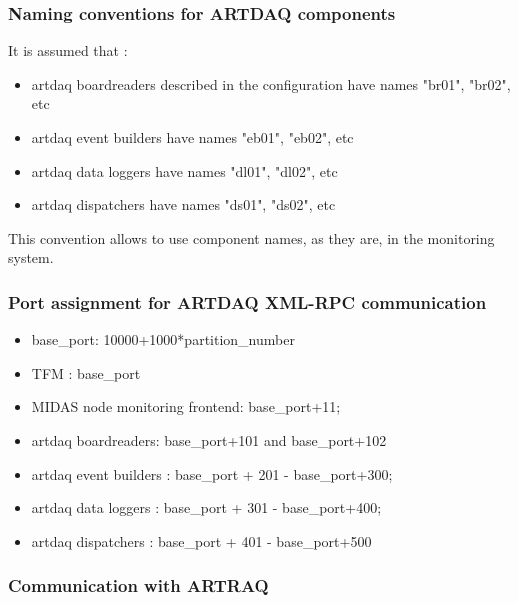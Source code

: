 \subsubsection{Naming conventions for ARTDAQ components}

It is assumed that :
\begin{itemize}
\item 
  artdaq boardreaders described in the configuration have names "br01", "br02", etc
\item 
  artdaq event builders have names "eb01", "eb02", etc
\item 
  artdaq data loggers have names "dl01", "dl02", etc
\item 
  artdaq dispatchers have names "ds01", "ds02", etc
\end{itemize}

This convention allows to use component names, as they are, in the monitoring system.

\subsubsection{Port assignment for ARTDAQ XML-RPC communication}
\begin{itemize}
\item
  base\_port: 10000+1000*partition\_number
\item 
  TFM : base\_port
\item 
  MIDAS node monitoring frontend: base\_port+11;
\item 
  artdaq boardreaders: base\_port+101 and base\_port+102
\item 
  artdaq event builders : base\_port + 201 - base\_port+300;
\item 
  artdaq data loggers  : base\_port + 301 - base\_port+400;
\item 
  artdaq dispatchers : base\_port + 401 - base\_port+500
\end{itemize}


\subsubsection{Communication with ARTRAQ}

